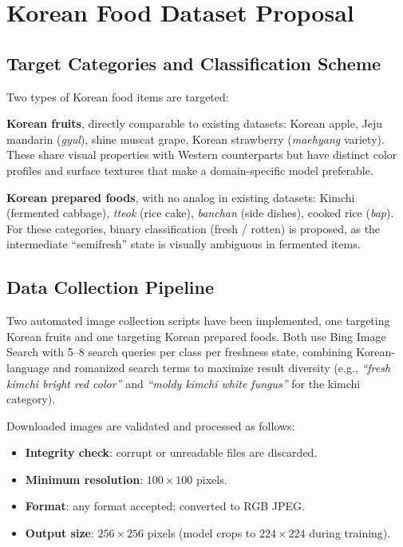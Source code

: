 \documentclass[12pt, a4paper]{article}
\begin{document}
\section{Korean Food Dataset Proposal}

\subsection{Target Categories and Classification Scheme}

Two types of Korean food items are targeted:

\textbf{Korean fruits}, directly comparable to existing datasets:
Korean apple, Jeju mandarin (\textit{gyul}), shine muscat grape,
Korean strawberry (\textit{maehyang} variety).
These share visual properties with Western counterparts but have distinct color
profiles and surface textures that make a domain-specific model preferable.

\textbf{Korean prepared foods}, with no analog in existing datasets:
Kimchi (fermented cabbage), \textit{tteok} (rice cake),
\textit{banchan} (side dishes), cooked rice (\textit{bap}).
For these categories, binary classification (fresh / rotten) is proposed,
as the intermediate ``semifresh'' state is visually ambiguous in fermented items.

\subsection{Data Collection Pipeline}

Two automated image collection scripts have been implemented, one targeting
Korean fruits and one targeting Korean prepared foods.
Both use Bing Image Search with 5--8 search queries per class per freshness
state, combining Korean-language and romanized search terms to maximize
result diversity (e.g., \textit{``fresh kimchi bright red color''} and
\textit{``moldy kimchi white fungus''} for the kimchi category).

Downloaded images are validated and processed as follows:
\begin{itemize}
    \item \textbf{Integrity check}: corrupt or unreadable files are discarded.
    \item \textbf{Minimum resolution}: $100 \times 100$ pixels.
    \item \textbf{Format}: any format accepted; converted to RGB JPEG.
    \item \textbf{Output size}: $256 \times 256$ pixels
    (model crops to $224 \times 224$ during training).
\end{itemize}
\end{document}
